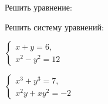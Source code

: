 %	
%	
%	
%	
%	
%	
%	
%	
\newpage
\chead{}
\begin{listofex}
	\item Решить уравнение:
	\begin{enumcols}[itemcolumns=2]
		\item {}
		\item {}
		\item {}
	\end{enumcols}
	\item Решить систему уравнений:
	\begin{enumcols}[itemcolumns=2]
		\item {}
		\item
		\( \left\{
		\begin{array}{l}
			x+y=6,\\
			x^2-y^2=12
		\end{array}
		\right. \)
		\item
		\( \left\{
		\begin{array}{l}
			x^3+y^3=7,\\
			x^2y+xy^2=-2
		\end{array}
		\right. \)
	\end{enumcols}
\end{listofex}